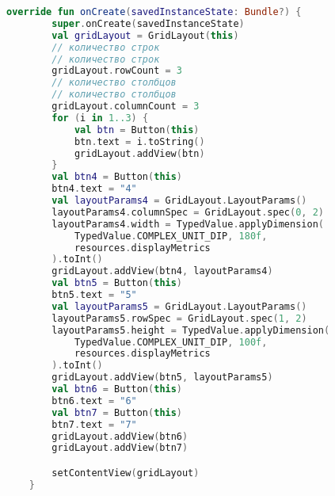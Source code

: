 \begin{lstlisting}[language=Kotlin, caption=\leftline{Kotlin}, label=lst:GridLayoutP]
override fun onCreate(savedInstanceState: Bundle?) {
        super.onCreate(savedInstanceState)
        val gridLayout = GridLayout(this)
        // количество строк
        // количество строк
        gridLayout.rowCount = 3
        // количество столбцов
        // количество столбцов
        gridLayout.columnCount = 3
        for (i in 1..3) {
            val btn = Button(this)
            btn.text = i.toString()
            gridLayout.addView(btn)
        }
        val btn4 = Button(this)
        btn4.text = "4"
        val layoutParams4 = GridLayout.LayoutParams()
        layoutParams4.columnSpec = GridLayout.spec(0, 2)
        layoutParams4.width = TypedValue.applyDimension(
            TypedValue.COMPLEX_UNIT_DIP, 180f,
            resources.displayMetrics
        ).toInt()
        gridLayout.addView(btn4, layoutParams4)
        val btn5 = Button(this)
        btn5.text = "5"
        val layoutParams5 = GridLayout.LayoutParams()
        layoutParams5.rowSpec = GridLayout.spec(1, 2)
        layoutParams5.height = TypedValue.applyDimension(
            TypedValue.COMPLEX_UNIT_DIP, 100f,
            resources.displayMetrics
        ).toInt()
        gridLayout.addView(btn5, layoutParams5)
        val btn6 = Button(this)
        btn6.text = "6"
        val btn7 = Button(this)
        btn7.text = "7"
        gridLayout.addView(btn6)
        gridLayout.addView(btn7)

        setContentView(gridLayout)
    }
\end{lstlisting}
